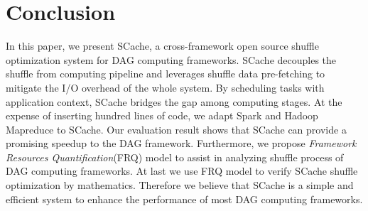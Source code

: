 \section{Conclusion}
 In this paper, we present SCache, a cross-framework open source shuffle optimization system for DAG computing frameworks. SCache decouples the shuffle from computing pipeline and leverages shuffle data pre-fetching to mitigate the I/O overhead of the whole system. By scheduling tasks with application context, SCache bridges the gap among computing stages. 
 {\color{blue}
 At the expense of inserting hundred lines of code, we adapt Spark and Hadoop Mapreduce to SCache. Our evaluation result shows that SCache can provide a promising speedup to the DAG framework. 
 Furthermore, we propose \textit{Framework Resources Quantification}(FRQ) model to assist in analyzing shuffle process of DAG computing frameworks. At last we use FRQ model to verify SCache shuffle optimization by mathematics.
 Therefore we believe that SCache is a simple and efficient system to enhance the performance of most DAG computing frameworks. 
 }
